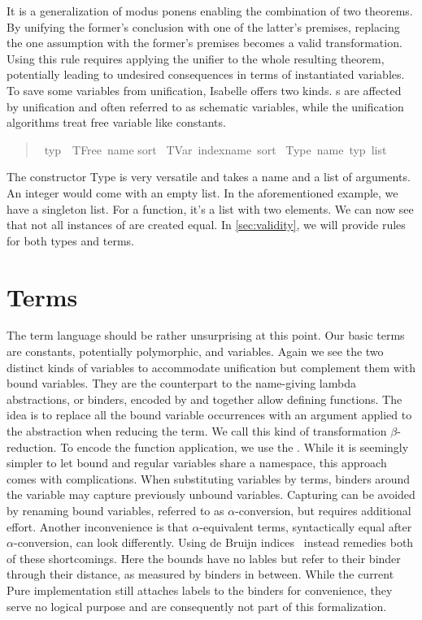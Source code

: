 It is a generalization of modus ponens enabling the combination of two theorems.
By unifying the former's conclusion with one of the latter's premises, replacing the one assumption with the former's premises becomes a valid transformation.
Using this rule requires applying the unifier to the whole resulting theorem, potentially leading to undesired consequences in terms of instantiated variables.
To save some variables from unification, Isabelle offers two kinds.
s are affected by unification and often referred to as schematic variables, while the unification algorithms treat free variable  like constants.


\begin{quote}
    \begin{isabelle}
        \ typ\ {\isacharequal}\ TFree\ name sort\isanewline
        \isaindent{\ \ }{\isacharbar}\ TVar\ indexname\ sort\isanewline
        \isaindent{\ \ }{\isacharbar}\ Type\ name\ {\isacharparenleft}typ\ list{\isacharparenright}
    \end{isabelle}
\end{quote}

The constructor Type is very versatile and takes a name and a list of arguments.
An integer would come with an empty list.
In the aforementioned  example, we have a singleton list.
For a function, it's a list with two elements.
We can now see that not all instances of  are created equal.
In \autoref{sec:validity}, we will provide rules for both types and terms.

\section{Terms}

The term language should be rather unsurprising at this point.
Our basic terms are constants, potentially polymorphic, and variables.
Again we see the two distinct kinds of variables to accommodate unification but complement them with bound variables.
They are the counterpart to the name-giving lambda abstractions, or binders, encoded by  and together allow defining functions.
The idea is to replace all the bound variable occurrences with an argument applied to the abstraction when reducing the term.
We call this kind of transformation \(\beta\)-reduction.
To encode the function application, we use the \isa{\$}.
While it is seemingly simpler to let bound and regular variables share a namespace, this approach comes with complications.
When substituting variables by terms, binders around the variable may capture previously unbound variables.
Capturing can be avoided by renaming bound variables, referred to as \(\alpha\)-conversion, but requires additional effort.
Another inconvenience is that \(\alpha\)-equivalent terms, syntactically equal after \(\alpha\)-conversion, can look differently.
Using de Bruijn indices~\parencite{DeBruijn72} instead remedies both of these shortcomings.
Here the bounds have no lables but refer to their binder through their distance, as measured by binders in between.
While the current Pure implementation still attaches labels to the binders for convenience, they serve no logical purpose and are consequently not part of this formalization.

